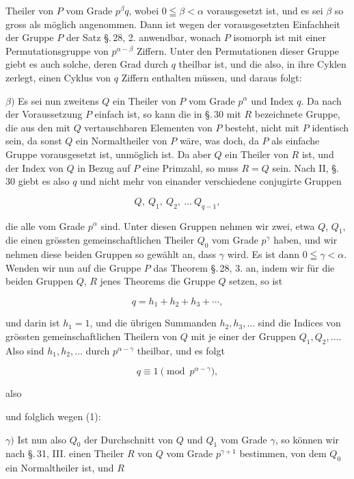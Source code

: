 Theiler von $P$ vom Grade $p^{\beta} q$, wobei $0 \leqq \beta < \alpha$ vorausgesetzt ist, und es sei $\beta$ so gross als möglich angenommen. Dann ist wegen der vorausgesetzten Einfachheit der Gruppe $P$ der Satz \S.\,28, 2. anwendbar, wonach $P$ isomorph ist mit einer Permutationsgruppe von $p^{\alpha-\beta}$ Ziffern. Unter den Permutationen dieser Gruppe giebt es auch solche, deren Grad durch $q$ theilbar ist, und die also, in ihre Cyklen zerlegt, einen Cyklus von $q$ Ziffern enthalten müssen, und daraus folgt:


$\beta)$ Es sei nun zweitens $Q$ ein Theiler von $P$ vom Grade $p^{\alpha}$ und Index $q$. Da nach der Voraussetzung $P$ einfach ist, so kann die in \S.\,30 mit $R$ bezeichnete Gruppe, die aus den mit $Q$ vertauschbaren Elementen von $P$ besteht, nicht mit $P$ identisch sein, da sonst $Q$ ein Normaltheiler von $P$ wäre, was doch, da $P$ als einfache Gruppe vorausgesetzt ist, unmöglich ist. Da aber $Q$ ein Theiler von $R$ ist, und der Index von $Q$ in Bezug auf $P$ eine Primzahl, so muss $R = Q$ sein. Nach II, \S.\,30 giebt es also $q$ und nicht mehr von einander verschiedene conjugirte Gruppen

\[ Q,\ Q_1,\ Q_2,\ \dots\ Q_{q-1}, \]

die alle vom Grade $p^{\alpha}$ sind. Unter diesen Gruppen nehmen wir zwei, etwa $Q$, $Q_1$, die einen grössten gemeinschaftlichen Theiler $Q_0$ vom Grade $p^{\gamma}$ haben, und wir nehmen diese beiden Gruppen so gewählt an, dass $\gamma$  wird. Es ist dann $0 \leqq \gamma < \alpha$. Wenden wir nun auf die Gruppe $P$ das Theorem \S.\,28, 3. an, indem wir für die beiden Gruppen $Q$, $R$ jenes Theorems die Gruppe $Q$ setzen, so ist

\[ q = h_1 + h_2 + h_3 + \cdots, \]

und darin ist $h_1 = 1$, und die übrigen Summanden $h_2, h_3, \dots$ sind die Indices von grössten gemeinschaftlichen Theilern von $Q$ mit je einer der Gruppen $Q_1, Q_2, \dots$. Also sind $h_1, h_2, \dots$ durch $p^{\alpha-\gamma}$ theilbar, %
und es folgt

\[ q \equiv 1 \pmod{p^{\alpha-\gamma}}, \]

also


und folglich wegen (1):


$\gamma)$ Ist nun also $Q_0$ der Durchschnitt von $Q$ und $Q_1$ vom Grade $\gamma$, %
so können wir nach \S.\,31, III. einen Theiler $R$ von $Q$ vom Grade $p^{\gamma+1}$ bestimmen, von dem $Q_0$ ein Normaltheiler ist, und $R$
